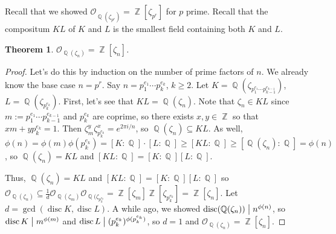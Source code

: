 \documentclass[11pt, a4paper]{memoir}
\DeclareMathOperator{\Q}{{\mathbb{Q}}}
\DeclareMathOperator{\Z}{{\mathbb{Z}}}
\renewcommand{\div}{\bigm|}
\theoremstyle{change}
\newtheorem{theorem}{Theorem}[section]
\theoremstyle{plain}
\theoremstyle{nonumberplain}
\newtheorem{proof}{Proof}
\DeclareMathOperator{\disc}{disc}
\begin{document}
Recall that we showed $\mathcal{O}_{\Q(\zeta_{p^r})}=\Z[\zeta_{p^r}]$ for $p$ prime.
Recall that the compositum $KL$ of $K$ and $L$ is the smallest field containing both $K$ and $L$.
\begin{theorem}
    $\mathcal{O}_{\Q(\zeta_n)}=\Z[\zeta_n]$.
\end{theorem}
\begin{proof}
    Let's do this by induction on the number of prime factors of $n$.
    We already know the base case $n=p^r$.
    Say $n=p_1^{e_1}\cdots p_k^{e_k}$, $k\geq 2$.
    Let $K=\Q(\zeta_{p_1^{e_1}\cdots p_{k-1}^{e_{k-1}}})$, $L=\Q(\zeta_{p_k^{e_k}})$.
    First, let's see that $KL=\Q(\zeta_n)$.
    Note that $\zeta_n\in KL$ since $m:=p_1^{e_1}\cdots p_{k-1}^{e_{k-1}}$ and $p_k^{e_k}$ are coprime, so there exists $x,y\in\Z$ so that $xm+yp_k^{e_k}=1$.
    Then $\zeta_m^y\zeta_{p_k^{e_k}}^x=e^{2\pi i/n}$, so $\Q(\zeta_n)\subseteq KL$.
    As well, $\phi(n)=\phi(m)\phi(p_k^{e_k})=[K:\Q]\cdot[L:\Q]\geq [KL:\Q]\geq[\Q(\zeta_n):\Q]=\phi(n)$, so $\Q(\zeta_n)=KL$ and $[KL:\Q]=[K:\Q][L:\Q]$.

    Thus, $\Q(\zeta_n)=KL$ and $[KL:\Q]=[K:\Q][L:\Q]$ so $\mathcal{O}_{\Q(\zeta_n)}\subseteq\frac{1}{d}\mathcal{O}_{\Q(\zeta_m)}\mathcal{O}_{\Q(\zeta_{p_k^{e_k}}}=\Z[\zeta_m]\Z[\zeta_{p_k^{e_k}}]=\Z[\zeta_n]$.
    Let $d=\gcd(\disc K,\disc L)$.
    A while ago, we showed $\disc(\Q(\zeta_n))\div n^{\phi(n)}$, so $\disc K\div m^{\phi(m)}$ and $\disc L\div (p_k^{e_k})^{\phi(p_k^{e_k})}$, so $d=1$ and $\mathcal{O}_{\Q(\zeta_n)}=\Z[\zeta_n]$.
\end{proof}
\end{document}
